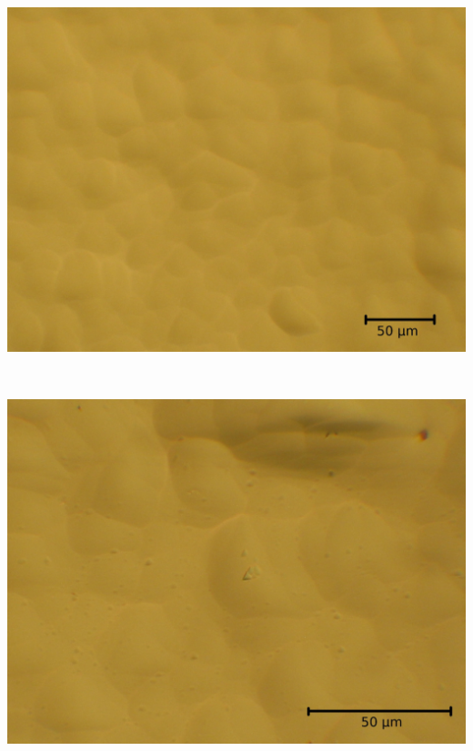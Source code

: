 \documentclass[german,  %
parskip=full,  %
]{scrartcl}
\begin{document}
\begin{minipage}{0.1\textwidth}\centering
\[\]
\end{minipage}
\begin{minipage}{0.45\textwidth}\centering
\includegraphics[scale=0.09]{Si_1Sch_25s_25x_00006}
\end{minipage} \\


\begin{minipage}{0.45\textwidth}\centering
\includegraphics[scale=0.09]{Si_2Sch_30s_2x25x_00010}
\end{minipage} \\\\
\end{document}
